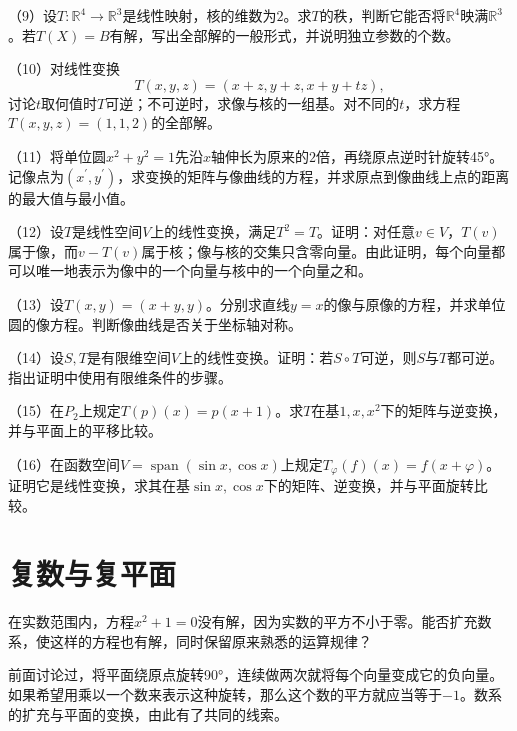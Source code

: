 \begin{exercise}
（9）设\(T : \mathbb{R}^{4} \longrightarrow \mathbb{R}^{3}\)是线性映射，核的维数为\(2\)。求\(T\)的秩，判断它能否将\(\mathbb{R}^{4}\)映满\(\mathbb{R}^{3}\)。若\(T \left( X \right) = B\)有解，写出全部解的一般形式，并说明独立参数的个数。

（10）对线性变换
\begin{equation*}
    T \left( x , y , z \right) = \left( x + z , y + z , x + y + t z \right) ,
\end{equation*}
讨论\(t\)取何值时\(T\)可逆；不可逆时，求像与核的一组基。对不同的\(t\)，求方程\(T \left( x , y , z \right) = \left( 1 , 1 , 2 \right)\)的全部解。

（11）将单位圆\(x^{2} + y^{2} = 1\)先沿\(x\)轴伸长为原来的\(2\)倍，再绕原点逆时针旋转45°。记像点为\(\left( x^{\prime} , y^{\prime} \right)\)，求变换的矩阵与像曲线的方程，并求原点到像曲线上点的距离的最大值与最小值。

（12）设\(T\)是线性空间\(V\)上的线性变换，满足\(T^{2} = T\)。证明：对任意\(v \in V\)，\(T \left( v \right)\)属于像，而\(v - T \left( v \right)\)属于核；像与核的交集只含零向量。由此证明，每个向量都可以唯一地表示为像中的一个向量与核中的一个向量之和。

（13）设\(T \left( x , y \right) = \left( x + y , y \right)\)。分别求直线\(y = x\)的像与原像的方程，并求单位圆的像方程。判断像曲线是否关于坐标轴对称。

（14）设\(S , T\)是有限维空间\(V\)上的线性变换。证明：若\(S \circ T\)可逆，则\(S\)与\(T\)都可逆。指出证明中使用有限维条件的步骤。

（15）在\(P_{2}\)上规定\(T \left( p \right) \left( x \right) = p \left( x + 1 \right)\)。求\(T\)在基\(1 , x , x^{2}\)下的矩阵与逆变换，并与平面上的平移比较。

（16）在函数空间\(V = \operatorname{span}\left( \sin x , \cos x \right)\)上规定\(T_{\varphi} \left( f \right) \left( x \right) = f \left( x + \varphi \right)\)。证明它是线性变换，求其在基\(\sin x , \cos x\)下的矩阵、逆变换，并与平面旋转比较。
\end{exercise}
\newpage

\section{复数与复平面}
在实数范围内，方程\(x^{2} + 1 = 0\)没有解，因为实数的平方不小于零。能否扩充数系，使这样的方程也有解，同时保留原来熟悉的运算规律？

前面讨论过，将平面绕原点旋转90°，连续做两次就将每个向量变成它的负向量。如果希望用乘以一个数来表示这种旋转，那么这个数的平方就应当等于\(- 1\)。数系的扩充与平面的变换，由此有了共同的线索。


